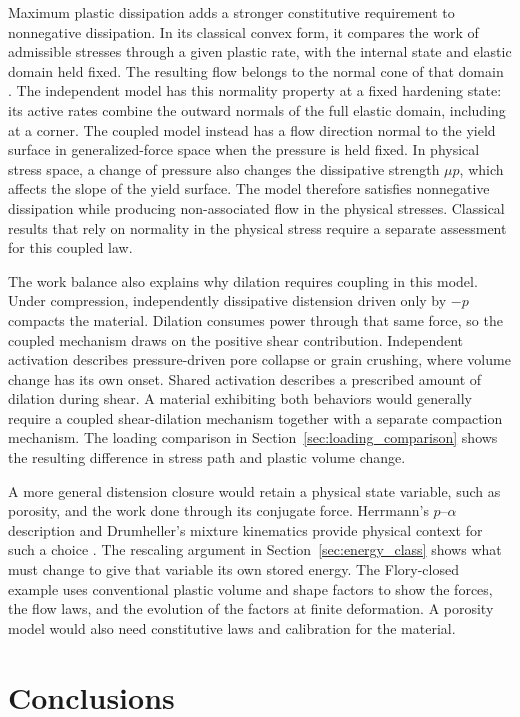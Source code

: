 \documentclass[11pt]{article}
\begin{document}
Maximum plastic dissipation adds a stronger constitutive requirement to
nonnegative dissipation. In its classical convex form, it compares the work
of admissible stresses through a given plastic rate, with the internal state
and elastic domain held fixed. The resulting flow belongs to the normal cone
of that domain \cite{bland1957,simo1988}. The independent model has this
normality property at a fixed hardening state: its active rates combine the
outward normals of the full elastic domain, including at a corner. The
coupled model instead has a flow direction normal to the yield surface in
generalized-force space when the pressure is held fixed. In physical stress
space, a change of pressure also changes the dissipative strength \(\mu p\),
which affects the slope of the yield surface. The model therefore satisfies
nonnegative dissipation while producing non-associated flow in the physical
stresses. Classical results that rely on normality in the physical stress
require a separate assessment for this coupled law.

The work balance also explains why dilation requires coupling in this model.
Under compression, independently dissipative distension driven only by
\(-p\) compacts the material. Dilation consumes power through that same
force, so the coupled mechanism draws on the positive shear contribution.
Independent activation describes pressure-driven pore collapse or grain
crushing, where volume change has its own onset. Shared activation describes a
prescribed amount of dilation during shear. A material exhibiting both
behaviors would generally require a coupled shear-dilation mechanism together
with a separate compaction mechanism. The loading comparison in
Section~\ref{sec:loading_comparison} shows the resulting difference in stress
path and plastic volume change.

A more general distension closure would retain a physical state variable,
such as porosity, and the work done through its conjugate force. Herrmann's
\(p\)--\(\alpha\) description and Drumheller's mixture kinematics provide
physical context for such a choice \cite{herrmann1969,drumheller2000}.
The rescaling argument in Section~\ref{sec:energy_class} shows what must
change to give that variable its own stored energy. The Flory-closed example
uses conventional plastic volume and shape factors to show the forces, the
flow laws, and the evolution of the factors at finite deformation. A porosity
model would also need constitutive laws and calibration for the material.

\section{Conclusions}
\label{sec:conclusions}
\end{document}
